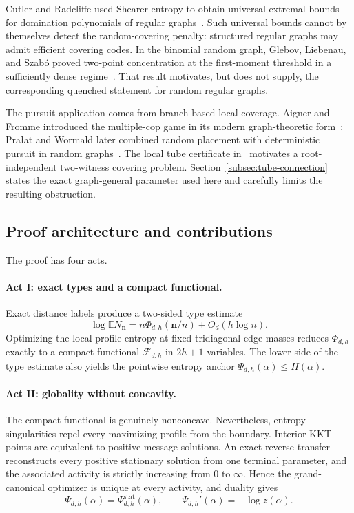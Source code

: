 \documentclass[11pt]{amsart}
\theoremstyle{definition}
\newcommand{\Fcal}{\mathcal F}
\newcommand{\E}{\mathbb E}
\begin{document}
Cutler and Radcliffe used Shearer entropy to obtain universal extremal bounds for domination polynomials of regular graphs~\cite{CutlerRadcliffe2016}.  Such universal bounds cannot by themselves detect the random-covering penalty: structured regular graphs may admit efficient covering codes.  In the binomial random graph, Glebov, Liebenau, and Szab\'o proved two-point concentration at the first-moment threshold in a sufficiently dense regime~\cite{GlebovLiebenauSzabo2015}.  That result motivates, but does not supply, the corresponding quenched statement for random regular graphs.

The pursuit application comes from branch-based local coverage.  Aigner and Fromme introduced the multiple-cop game in its modern graph-theoretic form~\cite{AignerFromme1984}; Pra\l at and Wormald later combined random placement with deterministic pursuit in random graphs~\cite{PralatWormald2016,PralatWormald2019}.  The local tube certificate in~\cite[Theorem~3.3 and Section~6.4]{Neuwirth2026Tube} motivates a root-independent two-witness covering problem.  Section~\ref{subsec:tube-connection} states the exact graph-general parameter used here and carefully limits the resulting obstruction.

\subsection{Proof architecture and contributions}
The proof has four acts.

\paragraph{Act I: exact types and a compact functional.}
Exact distance labels produce a two-sided type estimate
\[
 \log \E N_{\mathbf n}
 =n\Phi_{d,h}(\mathbf n/n)+O_d(h\log n).
\]
Optimizing the local profile entropy at fixed tridiagonal edge masses reduces $\Phi_{d,h}$ exactly to a compact functional $\Fcal_{d,h}$ in $2h+1$ variables.  The lower side of the type estimate also yields the pointwise entropy anchor
$\Psi_{d,h}(\alpha)\le H(\alpha)$.

\paragraph{Act II: globality without concavity.}
The compact functional is genuinely nonconcave.  Nevertheless, entropy singularities repel every maximizing profile from the boundary.  Interior KKT points are equivalent to positive message solutions.  An exact reverse transfer reconstructs every positive stationary solution from one terminal parameter, and the associated activity is strictly increasing from $0$ to $\infty$.  Hence the grand-canonical optimizer is unique at every activity, and duality gives
\[
 \Psi_{d,h}(\alpha)=\Psi^{\mathrm{stat}}_{d,h}(\alpha),
 \qquad
 \Psi_{d,h}'(\alpha)=-\log z(\alpha).
\]
\end{document}
